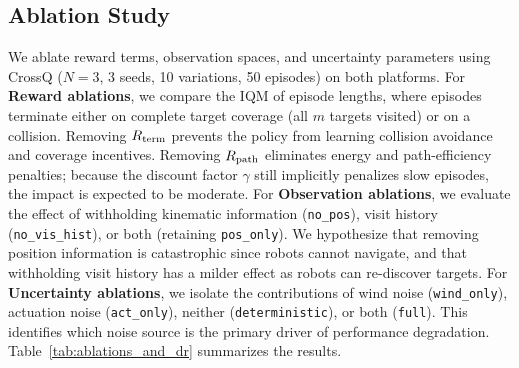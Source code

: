 \documentclass{article}
\begin{document}
\subsection{Ablation Study}
\label{sec:exp:ablation}

We ablate reward terms, observation spaces, and uncertainty parameters using CrossQ ($N=3$, 3 seeds, 10 variations, 50 episodes) on both platforms. For \textbf{Reward ablations}, we compare the IQM of episode lengths, where episodes terminate either on complete target coverage (all $m$ targets visited) or on a collision. Removing $R_{\mathrm{term}}$ prevents the policy from learning collision avoidance and coverage incentives. Removing $R_{\mathrm{path}}$ eliminates energy and path-efficiency penalties; because the discount factor $\gamma$ still implicitly penalizes slow episodes, the impact is expected to be moderate. For \textbf{Observation ablations}, we evaluate the effect of withholding kinematic information (\texttt{no\_pos}), visit history (\texttt{no\_vis\_hist}), or both (retaining \texttt{pos\_only}). We hypothesize that removing position information is catastrophic since robots cannot navigate, and that withholding visit history has a milder effect as robots can re-discover targets. For \textbf{Uncertainty ablations}, we isolate the contributions of wind noise (\texttt{wind\_only}), actuation noise (\texttt{act\_only}), neither (\texttt{deterministic}), or both (\texttt{full}). This identifies which noise source is the primary driver of performance degradation. Table~\ref{tab:ablations_and_dr} summarizes the results.
\end{document}

